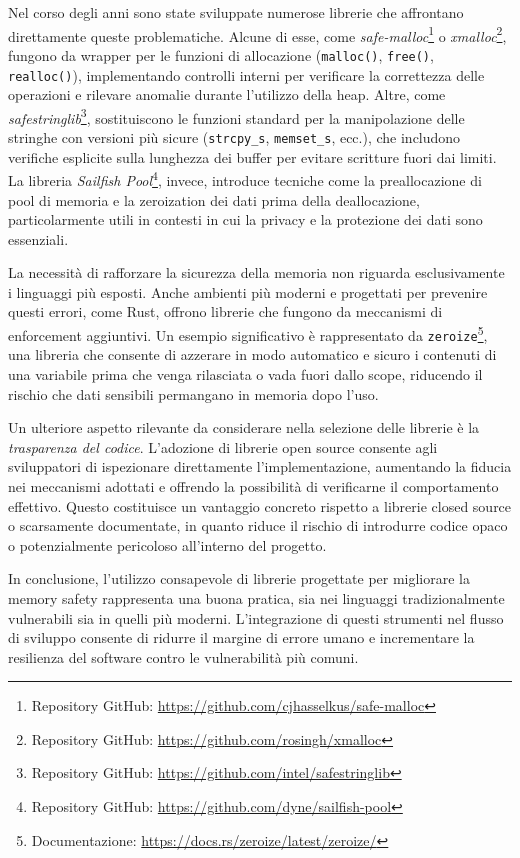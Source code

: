Nel corso degli anni sono state sviluppate numerose librerie che affrontano
direttamente queste problematiche. Alcune di esse, come \textit{safe-malloc}\protect\footnote{Repository
GitHub: \url{https://github.com/cjhasselkus/safe-malloc}} o \textit{xmalloc}\protect\footnote{Repository
GitHub: \url{https://github.com/rosingh/xmalloc}}, fungono da wrapper per le funzioni
di allocazione (\texttt{malloc()}, \texttt{free()}, \texttt{realloc()}), implementando
controlli interni per verificare la correttezza delle operazioni e rilevare anomalie
durante l'utilizzo della heap. Altre, come \textit{safestringlib}\protect\footnote{Repository
GitHub: \url{https://github.com/intel/safestringlib}}, sostituiscono le funzioni
standard per la manipolazione delle stringhe con versioni più sicure (\texttt{strcpy\_s},
\texttt{memset\_s}, ecc.), che includono verifiche esplicite sulla lunghezza dei
buffer per evitare scritture fuori dai limiti. La libreria \textit{Sailfish Pool}\protect\footnote{Repository
GitHub: \url{https://github.com/dyne/sailfish-pool}}, invece, introduce tecniche
come la preallocazione di pool di memoria e la zeroization dei dati prima della deallocazione,
particolarmente utili in contesti in cui la privacy e la protezione dei dati
sono essenziali.

La necessità di rafforzare la sicurezza della memoria non riguarda
esclusivamente i linguaggi più esposti. Anche ambienti più moderni e progettati per
prevenire questi errori, come Rust, offrono librerie che fungono da meccanismi di
enforcement aggiuntivi. Un esempio significativo è rappresentato da \texttt{zeroize}\protect\footnote{Documentazione:
\url{https://docs.rs/zeroize/latest/zeroize/}}, una libreria che consente di
azzerare in modo automatico e sicuro i contenuti di una variabile prima che
venga rilasciata o vada fuori dallo scope, riducendo il rischio che dati sensibili
permangano in memoria dopo l'uso.

Un ulteriore aspetto rilevante da considerare nella selezione delle librerie è la
\textit{trasparenza del codice}. L'adozione di librerie open source consente agli
sviluppatori di ispezionare direttamente l'implementazione, aumentando la
fiducia nei meccanismi adottati e offrendo la possibilità di verificarne il
comportamento effettivo. Questo costituisce un vantaggio concreto rispetto a librerie
closed source o scarsamente documentate, in quanto riduce il rischio di
introdurre codice opaco o potenzialmente pericoloso all'interno del progetto.

In conclusione, l'utilizzo consapevole di librerie progettate per migliorare la memory
safety rappresenta una buona pratica, sia nei linguaggi tradizionalmente
vulnerabili sia in quelli più moderni. L'integrazione di questi strumenti nel flusso
di sviluppo consente di ridurre il margine di errore umano e incrementare la resilienza
del software contro le vulnerabilità più comuni.

